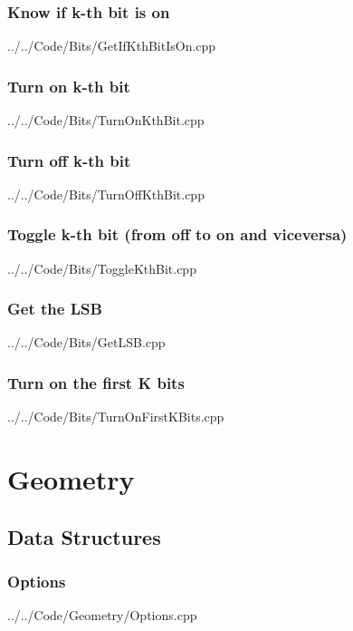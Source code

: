\documentclass[11pt, fleqn]{report}                             %
\theoremstyle{break}                                            %
\begin{document}
\begin{multicols}{2}
    \section{Know if k-th bit is on}
        
        {../../Code/Bits/GetIfKthBitIsOn.cpp}

    \section{Turn on k-th bit}
        
        {../../Code/Bits/TurnOnKthBit.cpp}

        \vfill\null
        \columnbreak

    \section{Turn off k-th bit}
        
        {../../Code/Bits/TurnOffKthBit.cpp}
  
    \section{Toggle k-th bit (from off to on and viceversa)}
        
        {../../Code/Bits/ToggleKthBit.cpp}

    \section{Get the LSB}
        
        {../../Code/Bits/GetLSB.cpp}
  
    \section{Turn on the first K bits}
        
        {../../Code/Bits/TurnOnFirstKBits.cpp}

\part{Geometry}

\chapter{Data Structures}

    \section{Options}
        
        {../../Code/Geometry/Options.cpp}


\end{multicols}
\end{document}

